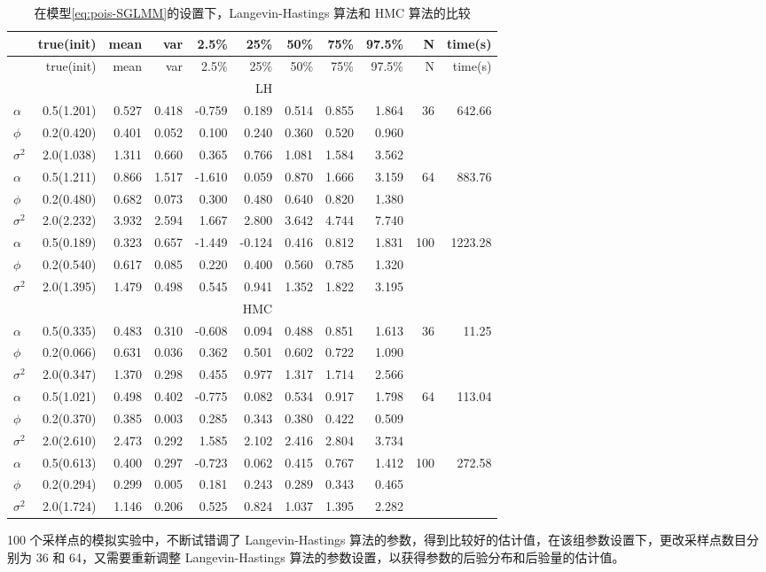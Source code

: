 \documentclass[12pt,a4paper,UTF8,twoside]{book}
\theoremstyle{definition}
\theoremstyle{definition}
\theoremstyle{definition}
\theoremstyle{remark}
\begin{document}
\begin{longtable}[]{@{}lrrrrrrrrrr@{}}
\caption{\label{tab:Pois-MCLV-vs-NUTS}
在模型\eqref{eq:pois-SGLMM}的设置下，Langevin-Hastings 算法和 HMC
算法的比较}\tabularnewline
\toprule
& true(init) & mean & var & 2.5\% & 25\% & 50\% & 75\% & 97.5\% & N &
time(s)\tabularnewline
\midrule
\endfirsthead
\toprule
& true(init) & mean & var & 2.5\% & 25\% & 50\% & 75\% & 97.5\% & N &
time(s)\tabularnewline
\midrule
\endhead
& & & & & LH & & & & &\tabularnewline
\(\alpha\) & 0.5(1.201) & 0.527 & 0.418 & -0.759 & 0.189 & 0.514 & 0.855
& 1.864 & 36 & 642.66\tabularnewline
\(\phi\) & 0.2(0.420) & 0.401 & 0.052 & 0.100 & 0.240 & 0.360 & 0.520 &
0.960 & &\tabularnewline
\(\sigma^2\) & 2.0(1.038) & 1.311 & 0.660 & 0.365 & 0.766 & 1.081 &
1.584 & 3.562 & &\tabularnewline
\(\alpha\) & 0.5(1.211) & 0.866 & 1.517 & -1.610 & 0.059 & 0.870 & 1.666
& 3.159 & 64 & 883.76\tabularnewline
\(\phi\) & 0.2(0.480) & 0.682 & 0.073 & 0.300 & 0.480 & 0.640 & 0.820 &
1.380 & &\tabularnewline
\(\sigma^2\) & 2.0(2.232) & 3.932 & 2.594 & 1.667 & 2.800 & 3.642 &
4.744 & 7.740 & &\tabularnewline
\(\alpha\) & 0.5(0.189) & 0.323 & 0.657 & -1.449 & -0.124 & 0.416 &
0.812 & 1.831 & 100 & 1223.28\tabularnewline
\(\phi\) & 0.2(0.540) & 0.617 & 0.085 & 0.220 & 0.400 & 0.560 & 0.785 &
1.320 & &\tabularnewline
\(\sigma^2\) & 2.0(1.395) & 1.479 & 0.498 & 0.545 & 0.941 & 1.352 &
1.822 & 3.195 & &\tabularnewline
& & & & & HMC & & & & &\tabularnewline
\(\alpha\) & 0.5(0.335) & 0.483 & 0.310 & -0.608 & 0.094 & 0.488 & 0.851
& 1.613 & 36 & 11.25\tabularnewline
\(\phi\) & 0.2(0.066) & 0.631 & 0.036 & 0.362 & 0.501 & 0.602 & 0.722 &
1.090 & &\tabularnewline
\(\sigma^2\) & 2.0(0.347) & 1.370 & 0.298 & 0.455 & 0.977 & 1.317 &
1.714 & 2.566 & &\tabularnewline
\(\alpha\) & 0.5(1.021) & 0.498 & 0.402 & -0.775 & 0.082 & 0.534 & 0.917
& 1.798 & 64 & 113.04\tabularnewline
\(\phi\) & 0.2(0.370) & 0.385 & 0.003 & 0.285 & 0.343 & 0.380 & 0.422 &
0.509 & &\tabularnewline
\(\sigma^2\) & 2.0(2.610) & 2.473 & 0.292 & 1.585 & 2.102 & 2.416 &
2.804 & 3.734 & &\tabularnewline
\(\alpha\) & 0.5(0.613) & 0.400 & 0.297 & -0.723 & 0.062 & 0.415 & 0.767
& 1.412 & 100 & 272.58\tabularnewline
\(\phi\) & 0.2(0.294) & 0.299 & 0.005 & 0.181 & 0.243 & 0.289 & 0.343 &
0.465 & &\tabularnewline
\(\sigma^2\) & 2.0(1.724) & 1.146 & 0.206 & 0.525 & 0.824 & 1.037 &
1.395 & 2.282 & &\tabularnewline
\bottomrule
\end{longtable}

100 个采样点的模拟实验中，不断试错调了 Langevin-Hastings
算法的参数，得到比较好的估计值，在该组参数设置下，更改采样点数目分别为
36 和 64，又需要重新调整 Langevin-Hastings
算法的参数设置，以获得参数的后验分布和后验量的估计值。
\end{document}
